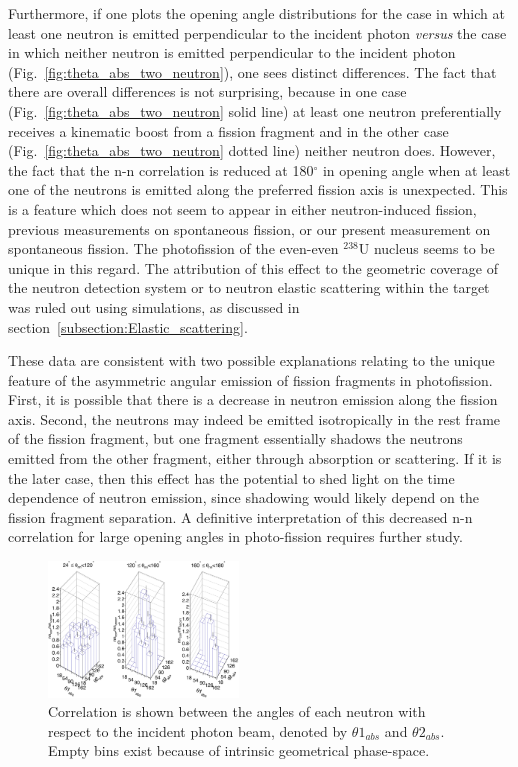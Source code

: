 \documentclass[%
 reprint,
 amsmath,amssymb,
 aps,
 nofootinbib
]{revtex4-1}
\begin{document}
Furthermore, if one plots the opening angle distributions for the case in which at least one neutron is emitted perpendicular to the incident photon \emph{versus} the case in which neither neutron is emitted perpendicular to the incident photon (Fig.~\ref{fig:theta_abs_two_neutron}), one sees distinct differences.
The fact that there are overall differences is not surprising, because in one case (Fig.~\ref{fig:theta_abs_two_neutron} solid line) at least one neutron preferentially receives a kinematic boost from a fission fragment and in the other case (Fig.~\ref{fig:theta_abs_two_neutron} dotted line) neither neutron does.
However, the fact that the n-n correlation is reduced at 180$^{\circ}$ in opening angle when at least one of the neutrons is emitted along the preferred fission axis is unexpected.
This is a feature which does not seem to appear in either neutron-induced fission, previous measurements on spontaneous fission, or our present measurement on spontaneous fission.
The photofission of the even-even $^{238}$U nucleus seems to be unique in this regard. 
The attribution of this effect to the geometric coverage of the neutron detection system or to neutron elastic scattering within the target was ruled out using simulations, as discussed in section~\ref{subsection:Elastic_scattering}.

These data are consistent with two possible explanations relating to the unique feature of the asymmetric angular emission of fission fragments in photofission.
First, it is possible that there is a decrease in neutron emission along the fission axis.
Second, the neutrons may indeed be emitted isotropically in the rest frame of the fission fragment, but one fragment essentially shadows the neutrons emitted from the other fragment, either through absorption or scattering.
If it is the later case, then this effect has the potential to shed light on the time dependence of neutron emission, since shadowing would likely depend on the fission fragment separation.
A definitive interpretation of this decreased n-n correlation for large opening angles in photo-fission requires further study.

\begin{figure}
    \includegraphics[width = 0.45\textwidth]{theta_abs_LEGO.png}
    \caption{Correlation is shown between the angles of each neutron with respect to the incident photon beam, denoted by $\theta 1_{abs}$ and $\theta 2_{abs}$.
    Empty bins exist because of intrinsic geometrical phase-space.}
    \label{fig:theta_abs_LEGO}
\end{figure}
\end{document}
